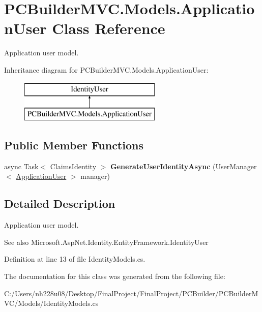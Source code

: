 \hypertarget{class_p_c_builder_m_v_c_1_1_models_1_1_application_user}{}\section{P\+C\+Builder\+M\+V\+C.\+Models.\+Application\+User Class Reference}
\label{class_p_c_builder_m_v_c_1_1_models_1_1_application_user}


Application user model.  


Inheritance diagram for P\+C\+Builder\+M\+V\+C.\+Models.\+Application\+User\+:\begin{figure}[H]
\begin{center}
\leavevmode
\includegraphics[height=2.000000cm]{class_p_c_builder_m_v_c_1_1_models_1_1_application_user}
\end{center}
\end{figure}
\subsection*{Public Member Functions}
\begin{DoxyCompactItemize}
\item 
async Task$<$ Claims\+Identity $>$ {\bfseries Generate\+User\+Identity\+Async} (User\+Manager$<$ \hyperlink{class_p_c_builder_m_v_c_1_1_models_1_1_application_user}{Application\+User} $>$ manager)\hypertarget{class_p_c_builder_m_v_c_1_1_models_1_1_application_user_a1958c9bf9604c202bc00ed69dd0425e4}{}\label{class_p_c_builder_m_v_c_1_1_models_1_1_application_user_a1958c9bf9604c202bc00ed69dd0425e4}

\end{DoxyCompactItemize}


\subsection{Detailed Description}
Application user model. 

\begin{DoxySeeAlso}{See also}
Microsoft.\+Asp\+Net.\+Identity.\+Entity\+Framework.\+Identity\+User


\end{DoxySeeAlso}


Definition at line 13 of file Identity\+Models.\+cs.



The documentation for this class was generated from the following file\+:\begin{DoxyCompactItemize}
\item 
C\+:/\+Users/nh228u08/\+Desktop/\+Final\+Project/\+Final\+Project/\+P\+C\+Builder/\+P\+C\+Builder\+M\+V\+C/\+Models/Identity\+Models.\+cs\end{DoxyCompactItemize}
